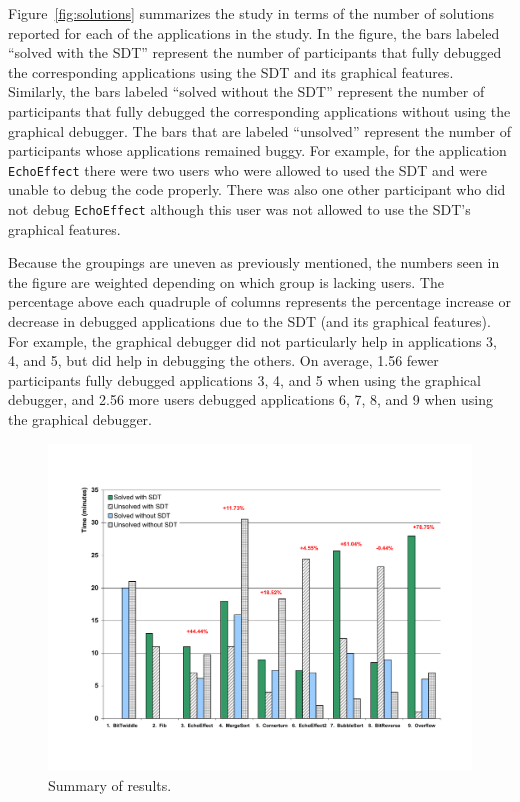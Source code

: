 \documentclass[times, 10pt,twocolumn]{article}
\begin{document}
Figure~\ref{fig:solutions} summarizes the study in terms of the number
of solutions  reported for each of  the applications in  the study. In
the figure,  the bars  labeled ``solved with  the SDT''  represent the
number   of  participants  that   fully  debugged   the  corresponding
applications using the SDT and its graphical features.  Similarly, the
bars  labeled  ``solved without  the  SDT''  represent  the number  of
participants  that  fully   debugged  the  corresponding  applications
without  using  the graphical  debugger.  The  bars  that are  labeled
``unsolved'' represent  the number of  participants whose applications
remained buggy.  For example, for  the application \texttt{EchoEffect}
there were two users who were  allowed to used the SDT and were unable
to debug the  code properly. There was also  one other participant who
did not  debug \texttt{EchoEffect} although this user  was not allowed
to use the SDT's graphical features.

Because the groupings are  uneven as previously mentioned, the numbers
seen in  the figure are weighted  depending on which  group is lacking
users. The  percentage above each quadruple of  columns represents the
percentage increase  or decrease in  debugged applications due  to the
SDT (and its graphical features).  For example, the graphical debugger
did not particularly help in applications 3, 4, and 5, but did help in
debugging  the  others.  On  average,  1.56  fewer participants  fully
debugged applications 3,  4, and 5 when using  the graphical debugger,
and 2.56  more users debugged applications  6, 7, 8, and  9 when using
the graphical debugger.

\begin{figure}[t]
\begin{center}
  \includegraphics[scale=.70, angle=270]{./times-results.pdf}
  \caption{Summary of results.}
  \label{fig:times}
\end{center}
\end{figure}
\end{document}
